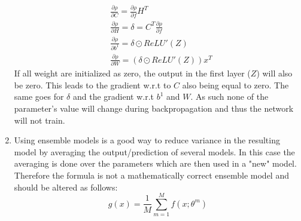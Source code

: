 \documentclass{article}
\begin{document}
\begin{enumerate}[label=(\alph*)]
\begin{align*}
		&\frac{\partial \rho}{\partial C} = \frac{\partial \rho}{\partial f} H^T\\
		&\frac{\partial \rho}{\partial H} = \delta = C^T \frac{\partial \rho}{\partial f} \\
		&\frac{\partial \rho}{\partial b^1} = \delta \odot ReLU'(Z) \\
		&\frac{\partial \rho}{\partial W} = \left(\delta \odot ReLU'(Z) \right)x^T
	\end{align*}
	If all weight are initialized as zero, the output in the first layer ($Z$) will also be zero. This leads to the gradient w.r.t to $C$ also being equal to zero. The same goes for $\delta$ and the gradient w.r.t $b^1$ and $W$. As such none of the parameter's value will change during backpropagation and thus the network will not train.
	\item Using ensemble models is a good way to reduce variance in the resulting model by averaging the output/prediction of several models. In this case the averaging is done over the parameters which are then used in a "new" model. Therefore the formula is not a mathematically correct ensemble model and should be altered as follows: $$g(x) = \frac{1}{M} \sum_{m=1}^M f(x; \theta^m)$$

\end{enumerate}
\end{document}
